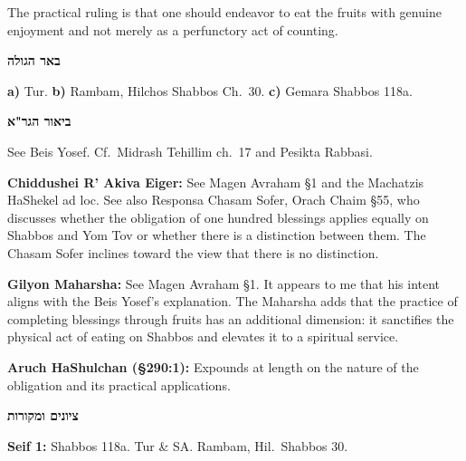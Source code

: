 \documentclass[11pt,letterpaper,openany]{scrbook}
\begin{document}
\begin{sloppypar}
\begin{minipage}[t]{0.49\textwidth}
\begin{mashbatzotbox}
The practical ruling is that one should endeavor to eat the fruits with genuine enjoyment and not merely as a perfunctory act of counting.
\end{mashbatzotbox}
\end{minipage}

\vspace{3pt}

\noindent
\begin{minipage}[t]{0.12\textwidth}
\begin{sideboxEng}
{\commentaryfont\fontsize{7}{9}\selectfont\textcolor{hcolor}{\textbf{\texthebrew{באר הגולה}}}}\par\smallskip
\textbf{a)} Tur.
\textbf{b)} Rambam, Hilchos Shabbos Ch.~30.
\textbf{c)} Gemara Shabbos 118a.

\medskip
{\commentaryfont\fontsize{7}{9}\selectfont\textcolor{hcolor}{\textbf{\texthebrew{ביאור הגר"א}}}}\par\smallskip
See Beis Yosef. Cf.~Midrash Tehillim ch.~17 and Pesikta Rabbasi.
\end{sideboxEng}
\end{minipage}%
\hfill
\begin{minipage}[t]{0.74\textwidth}
\begin{tcolorbox}[
  colback=white, colframe=hcolor,
  fontupper=\engfont\fontsize{9}{11}\selectfont,
  boxrule=0.5pt, arc=1pt,
  top=3pt, bottom=3pt, left=4pt, right=4pt,
  title={\engboldfont Additional Commentary Translations},
  coltitle=white, colbacktitle=hcolor
]
\begin{minipage}[t]{0.47\textwidth}
\textbf{Chiddushei R' Akiva Eiger:}
See Magen Avraham \S1 and the Machatzis HaShekel ad loc. See also Responsa Chasam Sofer, Orach Chaim \S55, who discusses whether the obligation of one hundred blessings applies equally on Shabbos and Yom Tov or whether there is a distinction between them. The Chasam Sofer inclines toward the view that there is no distinction.
\end{minipage}%
\hfill
\begin{minipage}[t]{0.47\textwidth}
\textbf{Gilyon Maharsha:}
See Magen Avraham \S1. It appears to me that his intent aligns with the Beis Yosef's explanation. The Maharsha adds that the practice of completing blessings through fruits has an additional dimension: it sanctifies the physical act of eating on Shabbos and elevates it to a spiritual service.

\medskip
\textbf{Aruch HaShulchan (\S290:1):}
Expounds at length on the nature of the obligation and its practical applications.
\end{minipage}
\end{tcolorbox}
\end{minipage}%
\hfill
\begin{minipage}[t]{0.12\textwidth}
\begin{sideboxEng}
{\commentaryfont\fontsize{7}{9}\selectfont\textcolor{hcolor}{\textbf{\texthebrew{ציונים ומקורות}}}}\par\smallskip
\textbf{Seif 1:}
Shabbos 118a.
Tur \& SA.
Rambam, Hil.~Shabbos 30.


\end{sideboxEng}
\end{minipage}
\end{sloppypar}
\end{document}
